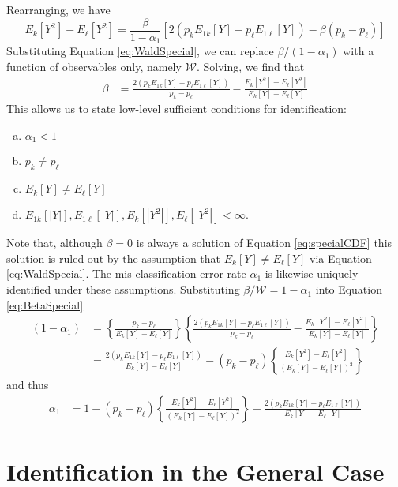 \documentclass[12pt]{article}
\begin{document}
Rearranging, we have
\begin{equation}
  E_k[Y^2] - E_\ell[Y^2] 
  =  \frac{\beta}{1 - \alpha_1}\left[2\left( p_k  E_{1k}[Y] -  p_\ell E_{1\ell}[Y]\right) - \beta(p_k - p_\ell)\right]
  \label{eq:SpecialSquared}
\end{equation}
Substituting Equation \ref{eq:WaldSpecial}, we can replace $\beta/(1-\alpha_1)$ with a function of observables only, namely $\mathcal{W}$.
Solving, we find that 
\begin{align}
  \beta &= \frac{2\left( p_k E_{1k}[Y] - p_\ell E_{1\ell}[Y] \right)}{p_k - p_\ell} - \frac{E_{k}[Y^2] - E_{\ell}[Y^2]}{E_k[Y] - E_\ell[Y]} 
  \label{eq:BetaSpecial}
\end{align}
This allows us to state low-level sufficient conditions for identification:
\begin{enumerate}[(a)]
  \item $\alpha_1 < 1$
  \item $p_k \neq p_\ell$ 
  \item $E_k[Y] \neq E_\ell[Y]$ 
  \item $E_{1k}[|Y|], E_{1\ell}[|Y|], E_k[|Y^2|], E_\ell[|Y^2|] < \infty$.
\end{enumerate}
Note that, although $\beta = 0$ is always a solution of Equation \ref{eq:specialCDF} this solution is ruled out by the assumption that $E_k[Y] \neq E_\ell[Y]$ via Equation \ref{eq:WaldSpecial}.
The mis-classification error rate $\alpha_1$ is likewise uniquely identified under these assumptions.
Substituting $\beta/\mathcal{W} = 1-\alpha_1$ into Equation \ref{eq:BetaSpecial}
\begin{align*}
  (1 - \alpha_1) &= \left\{ \frac{p_k - p_\ell}{E_k[Y] - E_\ell[Y]} \right\}\left\{\frac{2\left( p_k E_{1k}[Y] - p_\ell E_{1\ell}[Y] \right)}{p_k - p_\ell} - \frac{E_{k}[Y^2] - E_{\ell}[Y^2]}{E_k[Y] - E_\ell[Y]} \right\}\\
  &= \frac{2\left( p_k E_{1k}[Y] - p_\ell E_{1\ell}[Y] \right)}{E_k[Y] - E_{\ell}[Y]} - (p_k - p_\ell)\left\{\frac{E_{k}[Y^2] - E_{\ell}[Y^2]}{\left(E_k[Y] - E_\ell[Y]\right)^2} \right\}
\end{align*}
and thus
\begin{align*}
  \alpha_1
  &= 1 + (p_k - p_\ell)\left\{\frac{E_{k}[Y^2] - E_{\ell}[Y^2]}{\left(E_k[Y] - E_\ell[Y]\right)^2} \right\} - \frac{2\left( p_k E_{1k}[Y] - p_\ell E_{1\ell}[Y] \right)}{E_k[Y] - E_{\ell}[Y]} 
\end{align*}

\section{Identification in the General Case}
\end{document}
